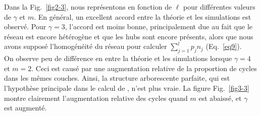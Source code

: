 Dans la Fig.~\ref{fig2-3}, nous représentons \nl en fonction de $\ell$ pour différentes valeurs de $\gamma$ et $m$. En général, un excellent accord entre la théorie et les simulations est observé. Pour $\gamma=3$, l'accord est moins bonne, principalement due au fait que le réseau est encore hétérogène et que les hubs sont encore présents, alors que nous avons supposé l'homogénéité du réseau pour calculer $\sum_{j=1}^{l} p_jn_j$ (Eq.~\ref{eq9}).\\
On observe peu de différence en \nl entre la théorie et les simulations lorsque $ \gamma = 4 $ et $ m = 2 $. Ceci est causé par une augmentation relative de la proportion de cycles dans les mêmes couches. Ainsi, la structure arborescente parfaite, qui est l'hypothèse principale dans le calcul de \nl, n'est plus vraie. La figure Fig.~\ref{fig3-3} montre clairement l'augmentation relative des cycles quand $ m $ est abaissé, et $ \gamma $ est augmenté.
